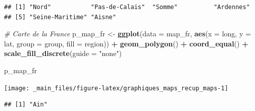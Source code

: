 \documentclass[
  11pt,
]{book}
\newenvironment{Shaded}{\begin{snugshade}}{\end{snugshade}}
\newcommand{\CommentTok}[1]{\textcolor[rgb]{0.56,0.35,0.01}{\textit{#1}}}
\newcommand{\DataTypeTok}[1]{\textcolor[rgb]{0.13,0.29,0.53}{#1}}
\newcommand{\KeywordTok}[1]{\textcolor[rgb]{0.13,0.29,0.53}{\textbf{#1}}}
\newcommand{\NormalTok}[1]{#1}
\newcommand{\OperatorTok}[1]{\textcolor[rgb]{0.81,0.36,0.00}{\textbf{#1}}}
\newcommand{\OtherTok}[1]{\textcolor[rgb]{0.56,0.35,0.01}{#1}}
\newcommand{\StringTok}[1]{\textcolor[rgb]{0.31,0.60,0.02}{#1}}
\numberwithin{equation}{section}
\numberwithin{countremarque}{section}
\begin{document}
\begin{lstlisting}
## [1] "Nord"           "Pas-de-Calais"  "Somme"          "Ardennes"      
## [5] "Seine-Maritime" "Aisne"
\end{lstlisting}

\begin{Shaded}
\begin{Highlighting}[]
\CommentTok{\# Carte de la France}
\NormalTok{p\_map\_fr \textless{}{-}}\StringTok{ }
\StringTok{  }\KeywordTok{ggplot}\NormalTok{(}\DataTypeTok{data =}\NormalTok{ map\_fr,}
         \KeywordTok{aes}\NormalTok{(}\DataTypeTok{x =}\NormalTok{ long, }\DataTypeTok{y =}\NormalTok{ lat, }\DataTypeTok{group =}\NormalTok{ group, }\DataTypeTok{fill =}\NormalTok{ region)) }\OperatorTok{+}
\StringTok{  }\KeywordTok{geom\_polygon}\NormalTok{() }\OperatorTok{+}\StringTok{ }\KeywordTok{coord\_equal}\NormalTok{() }\OperatorTok{+}\StringTok{ }\KeywordTok{scale\_fill\_discrete}\NormalTok{(}\DataTypeTok{guide =} \StringTok{"none"}\NormalTok{)}

\NormalTok{p\_map\_fr}
\end{Highlighting}
\end{Shaded}

\begin{center}\texttt{[image: \_main\_files/figure-latex/graphiques\_maps\_recup\_maps-1]} \end{center}

\begin{Shaded}
\end{Shaded}

\begin{lstlisting}
## [1] "Ain"
\end{lstlisting}
\end{document}
